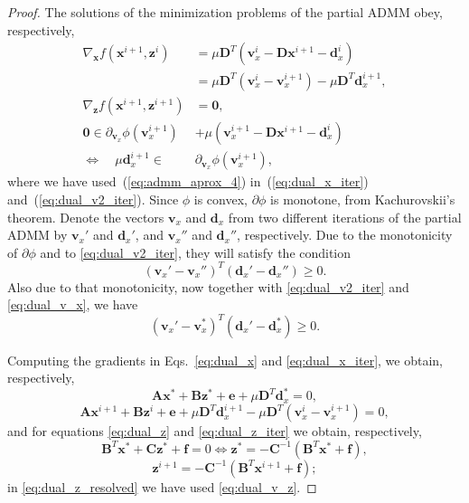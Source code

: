 \documentclass[10pt,twocolumn,twoside]{IEEEtran}
\newcommand{\x}{\mathbf{x}} %
\newcommand{\z}{\mathbf{z}} %
\newcommand{\vs}{\mathbf{v}} %
\newcommand{\dv}{\mathbf{d}} %
\newcommand{\D}{\mathbf{D}} %
\newcommand{\A}{\mathbf{A}} %
\newcommand{\B}{\mathbf{B}} %
\newcommand{\C}{\mathbf{C}} %
\newcommand{\e}{\mathbf{e}} %
\newcommand{\f}{\mathbf{f}} %
\begin{document}
\begin{proof}
	The solutions of the minimization problems of the partial ADMM obey, respectively,
	\begin{align}
	\nabla_{\x} f(\x^{i+1}, \z^i) &= \mu \D^T (\vs_x^i - \D \x^{i+1} - \dv_x^i) \nonumber \\
	&= \mu \D^T (\vs_x^i - \vs_x^{i+1}) - \mu \D^{T} \dv_x^{i+1}, \label{eq:dual_x_iter} \\
	\nabla_\z f(\x^{i+1}, \z^{i+1}) &= \mathbf 0,  \label{eq:dual_z_iter} \\
	\mathbf 0 \in \partial_{\vs_x} \phi(\vs_x^{i+1}) &+ \mu (\vs_x^{i+1} - \D \x^{i+1} - \dv_x^i) \nonumber \\
	\Leftrightarrow \quad \mu \dv_x^{i+1} \in \; &\partial_{\vs_x} \phi(\vs_x^{i+1}),  \label{eq:dual_v2_iter}
	\end{align}
	where we have used~(\ref{eq:admm_aprox_4}) in~(\ref{eq:dual_x_iter}) and~(\ref{eq:dual_v2_iter}). Since $\phi$ is convex, $\partial \phi$ is monotone, from Kachurovskii's theorem. Denote the vectors $\vs_x$ and $\dv_x$ from two different iterations of the partial ADMM by $\vs_x'$ and $\dv_x'$, and $\vs_x''$ and $\dv_x''$, respectively. Due to the monotonicity of $\partial \phi$ and to \eqref{eq:dual_v2_iter}, they will satisfy the condition
	\begin{equation} \label{eq:monotone1}
	(\vs_x' - \vs_x'')^T (\dv_x' - \dv_x'') \geq 0.
	\end{equation}
	Also due to that monotonicity, now together with \eqref{eq:dual_v2_iter} and \eqref{eq:dual_v_x}, we have
	\begin{equation} \label{eq:monotone2}
	(\vs_x' - \vs_x^*)^T (\dv_x' - \dv_x^*) \geq 0.
	\end{equation}
	
	Computing the gradients in Eqs.~\eqref{eq:dual_x} and \eqref{eq:dual_x_iter}, we obtain, respectively,
	\begin{equation} \label{eq:dual_x_resolved}
	\A \x^* + \B \z^* + \e + \mu \D^T \dv_x^* = 0,
	\end{equation}
	\begin{equation} \label{eq:dual_x_iter_resolved}
	\A \x^{i+1} + \B \z^i + \e + \mu \D^T \dv_x^{i+1} - \mu \D^T (\vs_x^i - \vs_x^{i+1}) = 0,
	\end{equation}
	and for equations \eqref{eq:dual_z} and \eqref{eq:dual_z_iter} we obtain, respectively,
	\begin{equation} \label{eq:dual_z_resolved}
	\B^T \x^* + \C \z^* + \f = 0 \Leftrightarrow \z^* = - \C^{-1} (\B^T \x^* + \f),
	\end{equation}	
	\begin{equation} \label{eq:dual_z_iter_resolved}
	\z^{i+1} = - \C^{-1} (\B^T \x^{i+1} + \f);
	\end{equation}
	in \eqref{eq:dual_z_resolved} we have used \eqref{eq:dual_v_z}.
	

\end{proof}
\end{document}
